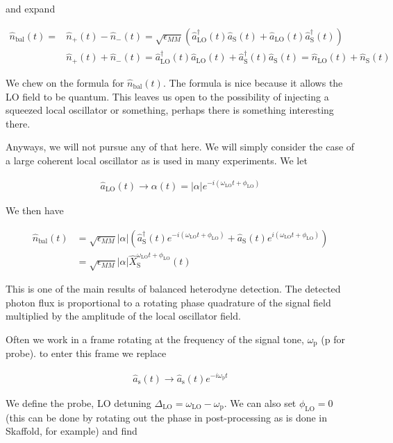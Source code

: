 \documentclass[12pt]{article}
\begin{document}
and expand

\begin{align}
\hat{n}_{\text{bal}}(t) = &\hat{n}_+(t) - \hat{n}_-(t) = \sqrt{\epsilon_{MM}} \left(\hat{a}^{\dag}_{\text{LO}}(t)\hat{a}_{\text{S}}(t) + \hat{a}_{\text{LO}}(t)\hat{a}^{\dag}_{\text{S}}(t) \right)\\
&\hat{n}_+(t) + \hat{n}_-(t) = \hat{a}^{\dag}_{\text{LO}}(t) \hat{a}_{\text{LO}}(t) + \hat{a}^{\dag}_{\text{S}}(t) \hat{a}_{\text{S}}(t) = \hat{n}_{\text{LO}}(t) + \hat{n}_{\text{S}}(t)
\end{align}

We chew on the formula for $\hat{n}_{\text{bal}}(t)$. The formula is nice because it allows the LO field to be quantum. This leaves us open to the possibility of injecting a squeezed local oscillator or something, perhaps there is something interesting there.

Anyways, we will not pursue any of that here. We will simply consider the case of a large coherent local oscillator as is used in many experiments. We let 

\begin{align}
\hat{a}_{\text{LO}}(t) \rightarrow \alpha(t) = |\alpha|e^{-i(\omega_{\text{LO}}t + \phi_{\text{LO}})}
\end{align}

We then have

\begin{align}
\hat{n}_{\text{bal}}(t) &= \sqrt{\epsilon_{MM}} |\alpha| \left(\hat{a}^{\dag}_{\text{S}}(t) e^{-i(\omega_{\text{LO}}t + \phi_{\text{LO}})}  + \hat{a}_{\text{S}}(t) e^{i(\omega_{\text{LO}}t + \phi_{\text{LO}})} \right)\\
&=\sqrt{\epsilon_{MM}}|\alpha|\hat{X}_{\text{S}}^{\omega_{\text{LO}}t + \phi_{\text{LO}}}(t)
\end{align}

This is one of the main results of balanced heterodyne detection. The detected photon flux is proportional to a rotating phase quadrature of the signal field multiplied by the amplitude of the local oscillator field.

Often we work in a frame rotating at the frequency of the signal tone, $\omega_{\text{p}}$ (p for probe). to enter this frame we replace 

\begin{align}
\hat{a}_{\text{s}}(t) \rightarrow \hat{a}_{\text{s}}(t)e^{-i\omega_{\text{p}}t}
\end{align}

We define the probe, LO detuning $\Delta_{\text{LO}} = \omega_{\text{LO}} - \omega_{\text{p}}$. We can also set $\phi_{\text{LO}} = 0$ (this can be done by rotating out the phase in post-processing as is done in Skaffold, for example) and find
\end{document}

